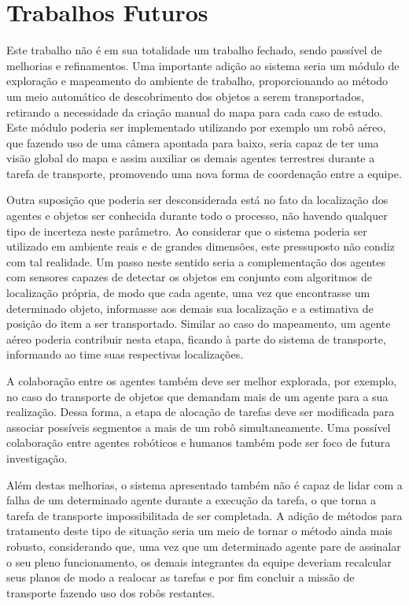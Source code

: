 \section{Trabalhos Futuros} %
\label{sec:trabalhos_futuros}


Este trabalho não é em sua totalidade um trabalho fechado, sendo passível de melhorias e refinamentos.
%
Uma importante adição ao sistema seria um módulo de exploração e mapeamento do ambiente de trabalho, proporcionando ao método um meio automático de descobrimento dos objetos a serem transportados, retirando a necessidade da criação manual do mapa para cada caso de estudo.
Este módulo poderia ser implementado utilizando por exemplo um robô aéreo, que fazendo uso de uma câmera apontada para baixo, seria capaz de ter uma visão global do mapa e assim auxiliar os demais agentes terrestres durante a tarefa de transporte, promovendo uma nova forma de coordenação entre a equipe.

Outra suposição que poderia ser desconsiderada está no fato da localização dos agentes e objetos ser conhecida durante todo o processo, não havendo qualquer tipo de incerteza neste parâmetro. Ao considerar que o sistema poderia ser utilizado em ambiente reais e de grandes dimensões, este pressuposto não condiz com tal realidade. Um passo neste sentido seria a complementação dos agentes com sensores capazes de detectar os objetos em conjunto com algoritmos de localização própria, de modo que cada agente, uma vez que encontrasse um determinado objeto, informasse aos demais sua localização e a estimativa de posição do item a ser transportado.
Similar ao caso do mapeamento, um agente aéreo poderia contribuir nesta etapa, ficando à parte do sistema de transporte, informando ao time suas respectivas localizações.

A colaboração entre os agentes também deve ser melhor explorada, por exemplo, no caso do transporte de objetos que demandam mais de um agente para a sua realização. Dessa forma, a etapa de alocação de tarefas deve ser modificada para associar possíveis segmentos a mais de um robô simultaneamente. Uma possível colaboração entre agentes robóticos e humanos também pode ser foco de futura investigação.

Além destas melhorias, o sistema apresentado também não é capaz de lidar com a falha de um determinado agente durante a execução da tarefa, o que torna a tarefa de transporte impossibilitada de ser completada. A adição de métodos para tratamento deste tipo de situação seria um meio de tornar o método ainda mais robusto, considerando que, uma vez que um determinado agente pare de assinalar o seu pleno funcionamento, os demais integrantes da equipe deveriam recalcular seus planos de modo a realocar as tarefas e por fim concluir a missão de transporte fazendo uso dos robôs restantes.

